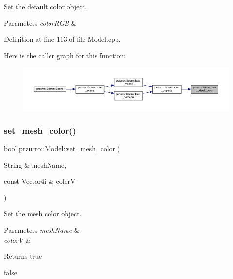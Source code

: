 Set the default color object. 


\begin{DoxyParams}{Parameters}
{\em color\+R\+GB} & \\
\hline
\end{DoxyParams}


Definition at line 113 of file Model.\+cpp.

Here is the caller graph for this function\+:
\nopagebreak
\begin{figure}[H]
\begin{center}
\leavevmode
\includegraphics[width=350pt]{d1/d88/classprzurro_1_1_model_a378be42503fd1bb19f286616fce4274f_icgraph}
\end{center}
\end{figure}
\mbox{\label{classprzurro_1_1_model_a1dee0161257ca282bedd2601dc539d43}} 
\subsubsection{\texorpdfstring{set\_mesh\_color()}{set\_mesh\_color()}}
{\footnotesize\ttfamily bool przurro\+::\+Model\+::set\+\_\+mesh\+\_\+color (\begin{DoxyParamCaption}\item[{String \&}]{mesh\+Name,  }\item[{const Vector4i \&}]{colorV }\end{DoxyParamCaption})}



Set the mesh color object. 


\begin{DoxyParams}{Parameters}
{\em mesh\+Name} & \\
\hline
{\em colorV} & \\
\hline
\end{DoxyParams}
\begin{DoxyReturn}{Returns}
true 

false 
\end{DoxyReturn}


